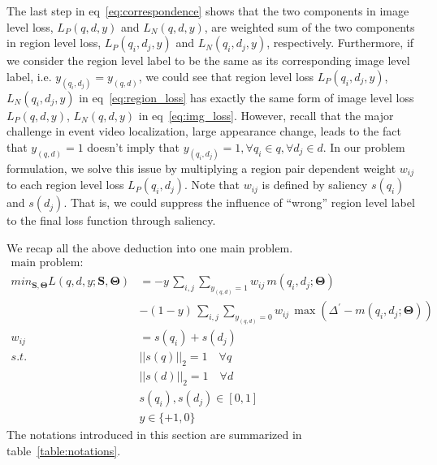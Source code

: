\normalsize
The last step in eq~\eqref{eq:correspondence} shows that the two components in image level loss, $L_P(q, d, y)$ and $L_N(q, d, y)$, are weighted sum of the two components in region level loss, $L_P(q_i, d_j, y)$ and $L_N(q_i, d_j, y)$, respectively. 
Furthermore, if we consider the region level label to be the same as its corresponding image level label, i.e. $y_{(q_i, d_j)} = y_{(q, d)}$, we could see that region level loss $L_P(q_i, d_j, y)$, $L_N(q_i, d_j, y)$ in eq~\eqref{eq:region_loss} has exactly the same form of image level loss $L_P(q, d, y)$, $L_N(q, d, y)$ in eq~\eqref{eq:img_loss}. 
However, recall that the major challenge in event video localization, large appearance change, leads to the fact that $y_{(q,d)} = 1$ doesn't imply that $y_{(q_i, d_j)} = 1, \forall q_i \in q, \forall d_j \in d$. 
In our problem formulation, we solve this issue by multiplying a region pair dependent weight $w_{ij}$ to each region level loss $L_P(q_i, d_j)$. 
Note that $w_{ij}$ is defined by saliency $s(q_i)$ and $s(d_j)$. 
That is, we could suppress the influence of ``wrong'' region level label to the final loss function through saliency. 

We recap all the above deduction into one main problem. 
\small
\begin{equation*}
\begin{aligned}
\text{main problem:}\\
min_{\mathbf{S}, \mathbf{\Theta}} L(q, d, y; \mathbf{S}, \mathbf{\Theta}) &= -y\, \sum_{i, j}\sum_{y_{(q, d)}=1} w_{ij}\, m(q_i, d_j; \mathbf{\Theta}) \\
& - (1-y)\, \sum_{i, j}\sum_{y_{(q, d)}=0} w_{ij}\, \max(\Delta^{'}-m(q_i, d_j; \mathbf{\Theta}))\\
w_{ij} &= s(q_i) + s(d_j)\\
s.t. & ||s(q)||_2 = 1 \quad \forall q\\
& ||s(d)||_2 = 1 \quad \forall d\\
& s(q_i), s(d_j) \in [0,1] \\
& y\in \{+1, 0\}
\end{aligned}
\end{equation*}
\normalsize
The notations introduced in this section are summarized in table~\ref{table:notations}. 

